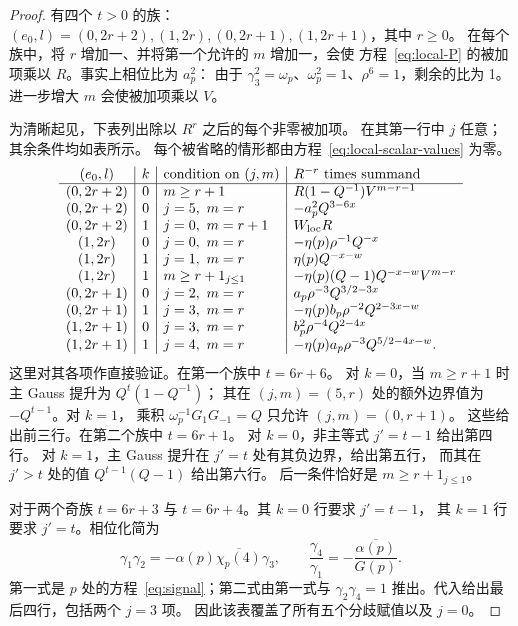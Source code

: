 \begin{proof}
有四个 $t>0$ 的族：
$(e_0,l)=(0,2r+2),(1,2r),(0,2r+1),(1,2r+1)$，其中 $r\ge0$。
在每个族中，将 $r$ 增加一、并将第一个允许的 $m$ 增加一，会使
方程~\eqref{eq:local-P} 的被加项乘以 $R$。事实上相位比为 $a_p^2$：
由于 $\gamma_3^2=\omega_p$、$\omega_p^2=1$、$\rho^6=1$，剩余的比为 1。
进一步增大 $m$ 会使被加项乘以 $V$。

为清晰起见，下表列出除以 $R^r$ 之后的每个非零被加项。
在其第一行中 $j$ 任意；其余条件均如表所示。
每个被省略的情形都由方程~\eqref{eq:local-scalar-values} 为零。
\begin{equation}\label{eq:local-family-table}
\begin{array}{c|c|l|l}
 (e_0,l)&k&\text{condition on }(j,m)&R^{-r}\text{ times summand}\\\hline
 (0,2r+2)&0&m\ge r+1&R(1-Q^{-1})V^{m-r-1}\\
 (0,2r+2)&0&j=5,\ m=r&-a_p^2Q^{3-6x}\\
 (0,2r+2)&1&j=0,\ m=r+1&W_{\rm loc}R\\
 (1,2r)&0&j=0,\ m=r&-\eta(p)\rho^{-1}Q^{-x}\\
 (1,2r)&1&j=1,\ m=r&\eta(p)Q^{-x-w}\\
 (1,2r)&1&m\ge r+1_{j\le1}&-\eta(p)(Q-1)Q^{-x-w}V^{m-r}\\
 (0,2r+1)&0&j=2,\ m=r&a_p\rho^{-3}Q^{3/2-3x}\\
 (0,2r+1)&1&j=3,\ m=r&-\eta(p)b_p\rho^{-2}Q^{2-3x-w}\\
 (1,2r+1)&0&j=3,\ m=r&b_p^2\rho^{-4}Q^{2-4x}\\
 (1,2r+1)&1&j=4,\ m=r&-\eta(p)a_p\rho^{-3}Q^{5/2-4x-w}.
\end{array}
\end{equation}
这里对其各项作直接验证。在第一个族中 $t=6r+6$。
对 $k=0$，当 $m\ge r+1$ 时主 Gauss 提升为 $Q^t(1-Q^{-1})$；
其在 $(j,m)=(5,r)$ 处的额外边界值为 $-Q^{t-1}$。对 $k=1$，
乘积 $\omega_p^{-1}G_1G_{-1}=Q$ 只允许 $(j,m)=(0,r+1)$。
这些给出前三行。在第二个族中 $t=6r+1$。
对 $k=0$，非主等式 $j'=t-1$ 给出第四行。
对 $k=1$，主 Gauss 提升在 $j'=t$ 处有其负边界，给出第五行，
而其在 $j'>t$ 处的值 $Q^{t-1}(Q-1)$ 给出第六行。
后一条件恰好是 $m\ge r+1_{j\le1}$。

对于两个奇族 $t=6r+3$ 与 $t=6r+4$。其 $k=0$ 行要求 $j'=t-1$，
其 $k=1$ 行要求 $j'=t$。相位化简为
\[
 \gamma_1\gamma_2
       =-\alpha(p)\overline{\chi_p(4)}\gamma_3,
 \qquad
 \frac{\gamma_4}{\gamma_1}
       =-\frac{\overline{\alpha(p)}}{G(p)}.
\]
第一式是 $p$ 处的方程~\eqref{eq:signal}；第二式由第一式与
$\gamma_2\gamma_4=1$ 推出。代入给出最后四行，包括两个 $j=3$ 项。
因此该表覆盖了所有五个分歧赋值以及 $j=0$。


\end{proof}
